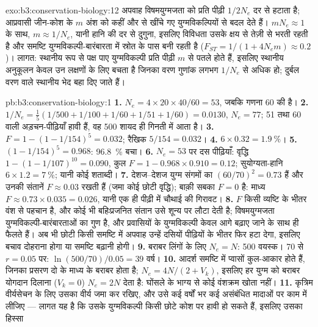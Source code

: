 \begin{solution}{exo:b3:conservation-biology:12}
अपवाह विषमयुग्मजता को प्रति पीढ़ी $1/2N_{e}$ दर से हटाता है; आप्रवासी
जीन-कोश के $m$ अंश को कहीं और से खींचे गए युग्मविकल्पियों से बदल देते
हैं। $mN_{e} \approx 1$ के साथ, $m \approx 1/N_{e}$, यानी हानि की दर से
दुगुना, इसलिए विविधता उसके क्षय से तेज़ी से भरती रहती है और समष्टि
युग्मविकल्पी-बारंबारता में स्रोत के पास बनी रहती है ($F_{ST} = 1/(1
+ 4N_{e}m) \approx 0.2$)। लागत: स्थानीय रूप से पक्ष पाए युग्मविकल्पी
प्रति पीढ़ी $m$ से पतले होते हैं, इसलिए स्थानीय अनुकूलन केवल उन लक्षणों
के लिए बचता है जिनका वरण गुणांक लगभग $1/N_{e}$ से अधिक हो; दुर्बल वरण
वाले स्थानीय भेद बहा दिए जाते हैं।
\end{solution}

\begin{solution}{pb:b3:conservation-biology:1}
\textbf{1.} $N_{e} = 4\times 20\times 40/60 = 53$, जबकि गणना 60 की है।
\textbf{2.} $1/N_{e} = \tfrac{1}{5}(1/500 + 1/100 + 1/60 + 1/51 + 1/60) =
0.0130$, $N_{e} = 77$; 51 तथा 60 वाली अड़चन-पीढ़ियाँ हावी हैं, वह 500
शायद ही गिनती में आता है।
\textbf{3.} $F = 1 - (1 - 1/154)^{5} = 0.032$; रैखिक $5/154 = 0.032$।
\textbf{4.} $6\times 0.32 = \qty{1.9}{\%}$।
\textbf{5.} $(1 - 1/154)^{5} = 0.968$: \qty{96.8}{\%} बचा।
\textbf{6.} $N_{e} = 53$ पर दस पीढ़ियाँ: वृद्धि $1 - (1 -
1/107)^{10} = 0.090$, कुल $F = 1 - 0.968\times 0.910 = 0.12$;
सुयोग्यता-हानि $6\times 1.2 = \qty{7}{\%}$; यानी कोई शताब्दी।
\textbf{7.} देशज--देशज युग्म संगमों का $(60/70)^{2} = 0.73$ हैं और उनकी
संतानें $F \approx 0.03$ रखती हैं (जमा कोई छोटी वृद्धि); बाक़ी सबका
$F = 0$ है: माध्य $F \approx 0.73\times 0.035 = 0.026$, यानी एक ही पीढ़ी
में चौथाई की गिरावट।
\textbf{8.} $F$ किसी व्यष्टि के भीतर वंश से पहचान है, और कोई भी
बहिःप्रजनित संतान उसे शून्य पर लौटा देती है; विषमयुग्मजता
युग्मविकल्पी-बारंबारताओं का गुण है, और प्रवासियों के युग्मविकल्पी केवल
आगे बढ़ाए जाने के साथ ही फैलते हैं। अब भी छोटी किसी समष्टि में अपवाह
उन्हें दसियों पीढ़ियों के भीतर फिर हटा देगा, इसलिए बचाव दोहराना होगा या
समष्टि बढ़ानी होगी।
\textbf{9.} बराबर लिंगों के लिए $N_{e} = N$: 500 वयस्क। 70 से $r =
0.05$ पर: $\ln(500/70)/0.05 = 39$ वर्ष।
\textbf{10.} आदर्श समष्टि में प्वासों कुल-आकार होते हैं, जिनका प्रसरण दो
के माध्य के बराबर होता है; $N_{e} = 4N/(2 + V_{k})$, इसलिए हर युग्म को
बराबर योगदान दिलाना ($V_{k} = 0$) $N_{e} = 2N$ देता है: घोंसले के भाग्य
से कोई वंशक्रम खोता नहीं।
\textbf{11.} कृत्रिम वीर्यसेचन के लिए उसका वीर्य जमा कर रखिए, और उसे कई
वर्षों भर कई असंबंधित मादाओं पर काम में लीजिए --- लागत यह है कि उसके
युग्मविकल्पी किसी छोटे कोश पर हावी हो सकते हैं, इसलिए उसका हिस्सा

\end{solution}
